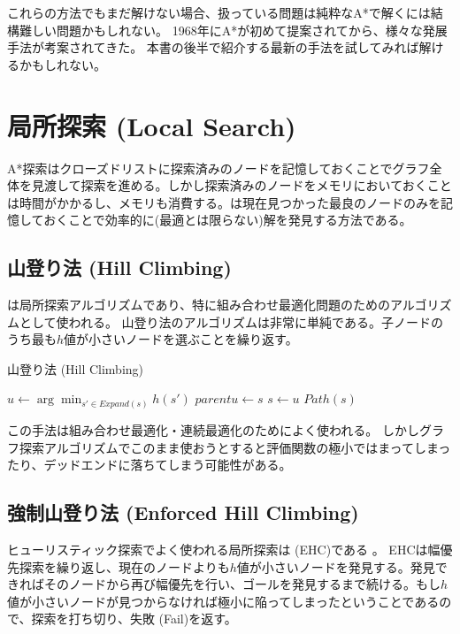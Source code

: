 これらの方法でもまだ解けない場合、扱っている問題は純粋なA*で解くには結構難しい問題かもしれない。
1968年にA*が初めて提案されてから、様々な発展手法が考案されてきた。
本書の後半で紹介する最新の手法を試してみれば解けるかもしれない。


\section{局所探索 (Local Search)}
\label{sec:local-search}

A*探索はクローズドリストに探索済みのノードを記憶しておくことでグラフ全体を見渡して探索を進める。しかし探索済みのノードをメモリにおいておくことは時間がかかるし、メモリも消費する。は現在見つかった最良のノードのみを記憶しておくことで効率的に(最適とは限らない)解を発見する方法である。

\subsection{山登り法 (Hill Climbing)}
\label{sec:hill-climbing}
は局所探索アルゴリズムであり、特に組み合わせ最適化問題のためのアルゴリズムとして使われる。
山登り法のアルゴリズムは非常に単純である。子ノードのうち最も$h$値が小さいノードを選ぶことを繰り返す。

\begin{algorithm}
\caption{山登り法 (Hill Climbing)}
	 {
	  $u \leftarrow \arg \min_{s' \in Expand(s)} h(s')$\;
          $parent{u} \leftarrow s$\;
          $s \leftarrow u$\;
	}
	\Return $Path(s)$
\label{alg:hill-climbing}
\end{algorithm}

この手法は組み合わせ最適化・連続最適化のためによく使われる。
しかしグラフ探索アルゴリズムでこのまま使おうとすると評価関数の極小ではまってしまったり、デッドエンドに落ちてしまう可能性がある。


\subsection{強制山登り法 (Enforced Hill Climbing)}

ヒューリスティック探索でよく使われる局所探索は (EHC)である \cite{hoffmann2005ignoring}。
EHCは幅優先探索を繰り返し、現在のノードよりも$h$値が小さいノードを発見する。発見できればそのノードから再び幅優先を行い、ゴールを発見するまで続ける。もし$h$値が小さいノードが見つからなければ極小に陥ってしまったということであるので、探索を打ち切り、失敗 (Fail)を返す。

